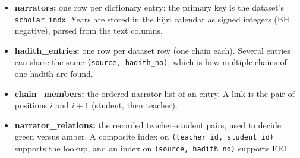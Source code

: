 \documentclass[11pt,a4paper]{article}
\begin{document}
\begin{itemize}
  \item \textbf{narrators:} one row per dictionary entry; the primary key is the dataset's \texttt{scholar\_indx}. Years are stored in the hijri calendar as signed integers (BH negative), parsed from the text columns.
  \item \textbf{hadith\_entries:} one row per dataset row (one chain each). Several entries can share the same \texttt{(source, hadith\_no)}, which is how multiple chains of one hadith are found.
  \item \textbf{chain\_members:} the ordered narrator list of an entry. A link is the pair of positions $i$ and $i{+}1$ (student, then teacher).
  \item \textbf{narrator\_relations:} the recorded teacher--student pairs, used to decide green versus amber. A composite index on \texttt{(teacher\_id, student\_id)} supports the lookup, and an index on \texttt{(source, hadith\_no)} supports FR1.
\end{itemize}
\end{document}
